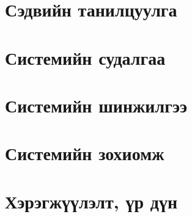 \chapter{Сэдвийн танилцуулга}


\chapter{Системийн судалгаа}


\chapter{Системийн шинжилгээ}


\chapter{Системийн зохиомж}


\chapter{Хэрэгжүүлэлт, үр дүн}
